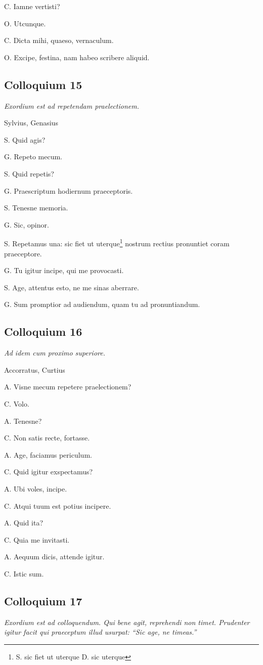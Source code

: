 \documentclass{article}
\begin{document}
C. Iamne vertisti?

O. Utcunque.

C. Dicta mihi, quaeso, vernaculum.

O. Excipe, festina, nam habeo scribere aliquid.

\subsection{Colloquium 15}
\emph{Exordium est ad repetendam praelectionem.}

Sylvius, Genasius

S. Quid agis?

G. Repeto mecum.

S. Quid repetis?

G. Praescriptum hodiernum praeceptoris.

S. Tenesne memoria.

G. Sic, opinor.

S. Repetamus una: sic fiet ut uterque\footnote{S. sic fiet ut uterque D. sic uterque} nostrum rectius pronuntiet coram praeceptore.

G. Tu igitur incipe, qui me provocasti.

S. Age, attentus esto, ne me sinas aberrare.

G. Sum promptior ad audiendum, quam tu ad pronuntiandum.

\subsection{Colloquium 16}
\emph{Ad idem cum proximo superiore.}

Accorratus, Curtius

A. Visne mecum repetere praelectionem?

C. Volo.

A. Tenesne?

C. Non satis recte, fortasse.

A. Age, faciamus periculum.

C. Quid igitur exspectamus?

A. Ubi voles, incipe.

C. Atqui tuum est potius incipere.

A. Quid ita?

C. Quia me invitasti.

A. Aequum dicis, attende igitur.

C. Istic sum.

\subsection{Colloquium 17}
\emph{Exordium est ad colloquendum. Qui bene agit, reprehendi non timet. Prudenter igitur facit qui praeceptum illud usurpat: ``Sic age, ne timeas.''}
\end{document}
